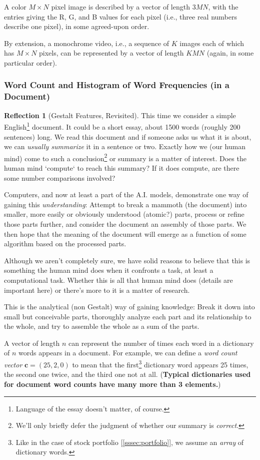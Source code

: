 \documentclass[11pt]{book}
\theoremstyle{definition}
\theoremstyle{plain}
\theoremstyle{problemstyle}
\theoremstyle{remark}
\theoremstyle{definition}
\newtheorem{reflection}{Reflection}
\begin{document}
A color $M\times N$ pixel image is described by a vector of length $3MN$, with the entries giving the R, G, and B values for each pixel (i.e., three real numbers describe one pixel), in some agreed-upon order.

By extension, a monochrome video, i.e., a sequence of $K$ images each of which has $M\times N$ pixels, can be represented by a vector of length $KMN$ (again, in some particular order).

\subsubsection*{Word Count and Histogram of Word Frequencies (in a Document)}
\begin{reflection}[Gestalt Features, Revisited]
    This time we consider a simple English\footnote{Language of the essay doesn't matter, of course.} document. It could be a short essay, about 1500 words (roughly 200 sentences) long. We read this document and if someone asks us what it is about, we can \emph{usually summarize} it in a sentence or two. Exactly how we (our human mind) come to such a conclusion\footnote{We'll only briefly defer the judgment of whether our summary is \emph{correct}.} or summary is a matter of interest. Does the human mind `compute` to reach this summary? If it does compute, are there some number comparisons involved?

    Computers, and now at least a part of the A.I. models, demonstrate one way of gaining this \emph{understanding}: Attempt to break a mammoth (the document) into smaller, more easily or obviously understood (atomic?) parts, process or refine those parts further, and consider the document an assembly of those parts. We then hope that the meaning of the document will emerge as a function of some algorithm based on the processed parts.

    Although we aren't completely sure, we have solid reasons to believe that this is something the human mind does when it confronts a task, at least a computational task. Whether this is all that human mind does (details are important here) or there's more to it is a matter of research. 

    This is the analytical (non Gestalt) way of gaining knowledge: Break it down into small but conceivable parts, thoroughly analyze each part and its relationship to the whole, and try to assemble the whole as a sum of the parts. 
\end{reflection}

A vector of length $n$ can represent the number of times each word in a dictionary of $n$ words appears in a document. For example, we can define a \emph{word count vector} $\boldsymbol{c}=(25,2,0)$ to mean that the first\footnote{Like in the case of stock portfolio [\ref{sssec:portfolio}], we assume an \emph{array} of dictionary words.} dictionary word appears 25 times, the second one twice, and the third one not at all. (\textbf{Typical dictionaries used for document word counts have many more than 3 elements.})
\end{document}
